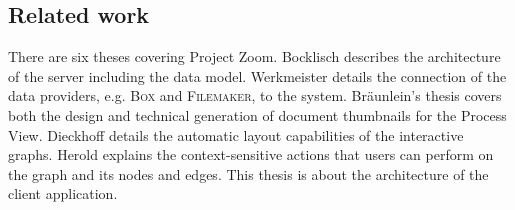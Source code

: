 \subsection{Related work}
There are six theses covering Project Zoom. Bocklisch \cite{Bocklisch_2013} describes the architecture of the server including the data model. Werkmeister \cite{Werkmeister_2013} details the connection of the data providers, e.g. \textsc{Box} and \textsc{Filemaker}, to the system. Bräunlein's thesis \cite{Braeunlein_2013} covers both the design and technical generation of document thumbnails for the Process View. Dieckhoff \cite{Dieckhoff_2013} details the automatic layout capabilities of the interactive graphs. Herold \cite{Herold_2013} explains the context-sensitive actions that users can perform on the graph and its nodes and edges. This thesis is about the architecture of the client application. 